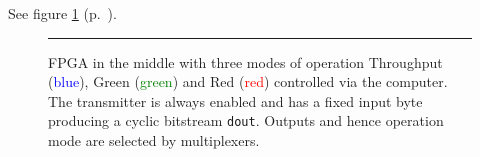 See figure \ref{fig:as3-schematic} (p.~\pageref{fig:as3-schematic}).

\begin{figure}[tb]
    \begin{center}
        
        \caption{FPGA in the middle with three modes of operation \textsf{Throughput} (\textcolor{blue}{blue}), \textsf{Green} (\textcolor{green}{green}) and \textsf{Red} (\textcolor{red}{red}) controlled via the computer. The transmitter is always enabled and has a fixed input byte producing a cyclic bitstream \texttt{dout}. Outputs and hence operation mode are selected by multiplexers.}
        \label{fig:as3-schematic}
        \vspace{1em}\hrule
    \end{center}
\end{figure}
